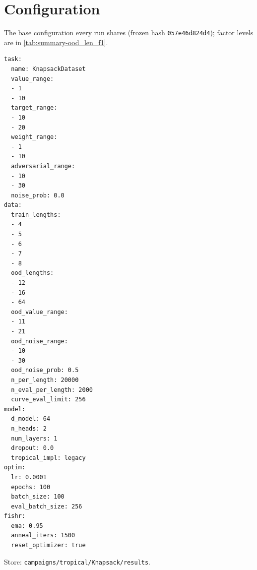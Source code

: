 \documentclass[10pt]{article}
\begin{document}
\section{Configuration}
The base configuration every run shares (frozen hash \texttt{057e46d824d4}); factor levels are in \autoref{tab:summary-ood_len_f1}.
{\footnotesize
\begin{verbatim}
task:
  name: KnapsackDataset
  value_range:
  - 1
  - 10
  target_range:
  - 10
  - 20
  weight_range:
  - 1
  - 10
  adversarial_range:
  - 10
  - 30
  noise_prob: 0.0
data:
  train_lengths:
  - 4
  - 5
  - 6
  - 7
  - 8
  ood_lengths:
  - 12
  - 16
  - 64
  ood_value_range:
  - 11
  - 21
  ood_noise_range:
  - 10
  - 30
  ood_noise_prob: 0.5
  n_per_length: 20000
  n_eval_per_length: 2000
  curve_eval_limit: 256
model:
  d_model: 64
  n_heads: 2
  num_layers: 1
  dropout: 0.0
  tropical_impl: legacy
optim:
  lr: 0.0001
  epochs: 100
  batch_size: 100
  eval_batch_size: 256
fishr:
  ema: 0.95
  anneal_iters: 1500
  reset_optimizer: true
\end{verbatim}
}
Store: \texttt{campaigns/tropical/Knapsack/results}.
\end{document}
